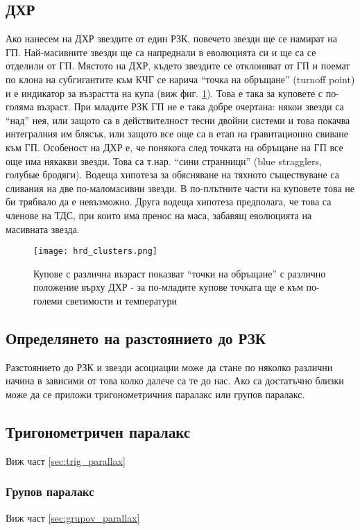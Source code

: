 \documentclass[a4paper,12pt]{article}
\begin{document}
\subsection{ДХР}
Ако нанесем на ДХР звездите от един РЗК, повечето звезди ще се намират на ГП. Най-масивните звезди ще са напреднали в еволюцията си и ще са се отделили от ГП. Мястото на ДХР, където звездите се отклоняват от ГП и поемат по клона на субгигантите към КЧГ се нарича ``точка на обръщане'' (turnoff point) и е индикатор за възрастта на купа (виж фиг. \ref{fig:hrd_clusters}). Това е така за куповете с по-голяма възраст. При младите РЗК ГП не е така добре очертана: някои звезди са “над” нея, или защото са в действителност тесни двойни системи и това покачва интегралния им блясък, или защото все още са в етап на гравитационно свиване към ГП. Особеност на ДХР е, че понякога след точката на обръщане на ГП все още има някакви звезди. Това са т.нар. “сини странници” (blue stragglers, голубые бродяги). Водеща хипотеза за обясняване на тяхното съществуване са сливания на две по-маломасивни звезди. В по-плътните части на куповете това не би трябвало да е невъзможно. Друга водеща хипотеза предполага, че това са членове на ТДС, при които има пренос на маса, забавящ еволюцията на масивната звезда.

\begin{figure}[h!]
\centering
\texttt{[image: hrd\_clusters.png]}
\caption{Купове с различна възраст показват ``точки на обръщане'' с различно положение върху ДХР - за по-младите купове точката ще е към по-големи светимости и температури}
\label{fig:hrd_clusters}
\end{figure}

\subsection{Определянето на разстоянието до РЗК}
Разстоянието до РЗК и звезди асоциации може да стане по няколко различни начина в зависими от това колко далече са те до нас. Ако са достатъчно близки може да се приложи тригонометричния паралакс или групов паралакс.

\subsection{Тригонометричен паралакс}
Виж част \ref{sec:trig_parallax}

\subsubsection{Групов паралакс}
Виж част \ref{sec:grupov_parallax}
\end{document}
